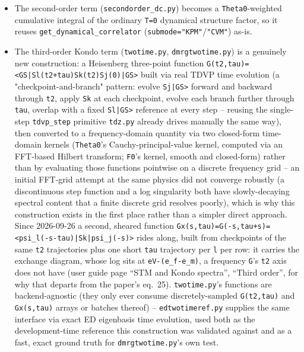 \documentclass[11pt]{article}
\begin{document}
\begin{itemize}
\item The second-order term (\texttt{secondorder\_dc.py}) becomes a
  \texttt{Theta0}-weighted cumulative integral of the ordinary
  \texttt{T=0} dynamical structure factor, so it reuses
  \texttt{get\_dynamical\_correlator} (\texttt{submode="KPM"}/\texttt{"CVM"})
  as-is.
\item The third-order Kondo term (\texttt{twotime.py},
  \texttt{dmrgtwotime.py}) is a genuinely new construction: a Heisenberg
  three-point function
  \texttt{G(t2,tau)=<GS|Sl(t2+tau)Sk(t2)Sj(0)|GS>} built via real TDVP
  time evolution (a "checkpoint-and-branch" pattern: evolve
  \texttt{Sj|GS>} forward and backward through \texttt{t2}, apply
  \texttt{Sk} at each checkpoint, evolve each branch further through
  \texttt{tau}, overlap with a fixed \texttt{Sl|GS>} reference at every
  step -- reusing the single-step \texttt{tdvp\_step} primitive
  \texttt{tdz.py} already drives manually the same way), then converted
  to a frequency-domain quantity via two closed-form time-domain kernels
  (\texttt{Theta0}'s Cauchy-principal-value kernel, computed via an
  FFT-based Hilbert transform; \texttt{F0}'s kernel, smooth and
  closed-form) rather than by evaluating those functions pointwise on a
  discrete frequency grid -- an initial FFT-grid attempt at the same
  physics did not converge robustly (a discontinuous step function and a
  log singularity both have slowly-decaying spectral content that a
  finite discrete grid resolves poorly), which is why this construction
  exists in the first place rather than a simpler direct approach.
  Since 2026-09-26 a second, sheared function
  \texttt{Gx(s,tau)=G(-s,tau+s)=<psi\_l(-s-tau)|Sk|psi\_j(-s)>} rides
  along, built from checkpoints of the same \texttt{t2} trajectories plus
  one short \texttt{tau} trajectory per \texttt{l} per row: it carries the
  exchange diagram, whose log sits at \texttt{eV-(e\_f-e\_m)}, a frequency
  \texttt{G}'s \texttt{t2} axis does not have (user guide page ``STM and Kondo
  spectra'', ``Third order'', for why that departs from the paper's
  eq.~25). \texttt{twotime.py}'s functions are backend-agnostic (they
  only ever consume discretely-sampled \texttt{G(t2,tau)} and
  \texttt{Gx(s,tau)} arrays or batches thereof) -- \texttt{edtwotimeref.py} supplies the same interface via
  exact ED eigenbasis time evolution, used both as the development-time
  reference this construction was validated against and as a fast, exact
  ground truth for \texttt{dmrgtwotime.py}'s own test.
\end{itemize}
\end{document}
